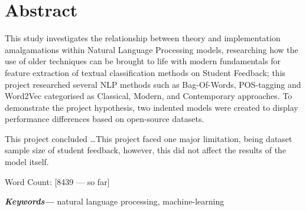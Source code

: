 \documentclass[12pt, a4paper]{report}
\providecommand{\keywords}[1]
{
  \small
  \textbf{\textit{Keywords---}} #1
}
\begin{document}
\chapter*{Abstract}	%


This study investigates the relationship between theory and implementation amalgamations within Natural Language Processing models, researching how the use of older techniques can be brought to life with modern fundamentals for feature extraction of textual classification methods on Student Feedback; this project researched several NLP methods such as Bag-Of-Words, POS-tagging and Word2Vec categorised as Classical, Modern, and Contemporary approaches. To demonstrate the project hypothesis, two indented models were created to display performance differences based on open-source datasets.

This project concluded \ldots This project faced one major limitation, being dataset sample size of student feedback, however, this did not affect the results of the model itself.

Word Count: [8439 --- so far]


\indent \keywords{natural language processing, machine-learning}

\newpage
\renewcommand{\contentsname}{Table of Contents}	%
\tableofcontents

\newpage
{}	%
\listoftables

\newpage
{}	%
\listoffigures


\newpage

{}
\end{document}
